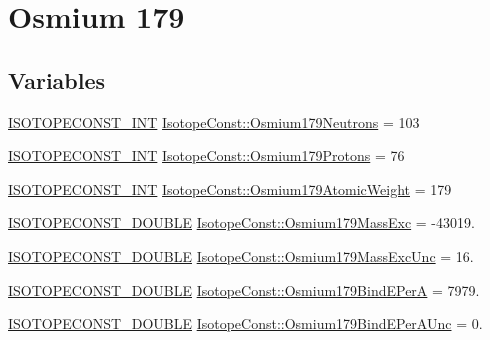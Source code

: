 \hypertarget{group___isotope_const-_osmium-_os179}{}\section{Osmium 179}
\label{group___isotope_const-_osmium-_os179}
\subsection*{Variables}
\begin{DoxyCompactItemize}
\item 
\mbox{\hyperlink{group___isotope_const-_macros_ga5f18360b3e99483a35c32d789e62621c}{I\+S\+O\+T\+O\+P\+E\+C\+O\+N\+S\+T\+\_\+\+I\+NT}} \mbox{\hyperlink{group___isotope_const-_osmium-_os179_ga57acb16b6f2ca1c5cada07e9a36fd16e}{Isotope\+Const\+::\+Osmium179\+Neutrons}} = 103
\item 
\mbox{\hyperlink{group___isotope_const-_macros_ga5f18360b3e99483a35c32d789e62621c}{I\+S\+O\+T\+O\+P\+E\+C\+O\+N\+S\+T\+\_\+\+I\+NT}} \mbox{\hyperlink{group___isotope_const-_osmium-_os179_gaaef6a4e4759e2fff9088199f24a255cc}{Isotope\+Const\+::\+Osmium179\+Protons}} = 76
\item 
\mbox{\hyperlink{group___isotope_const-_macros_ga5f18360b3e99483a35c32d789e62621c}{I\+S\+O\+T\+O\+P\+E\+C\+O\+N\+S\+T\+\_\+\+I\+NT}} \mbox{\hyperlink{group___isotope_const-_osmium-_os179_ga576c07028d0a757222f948e258fd2a59}{Isotope\+Const\+::\+Osmium179\+Atomic\+Weight}} = 179
\item 
\mbox{\hyperlink{group___isotope_const-_macros_ga8f45a7272ce02c0b4c65c44636ed719a}{I\+S\+O\+T\+O\+P\+E\+C\+O\+N\+S\+T\+\_\+\+D\+O\+U\+B\+LE}} \mbox{\hyperlink{group___isotope_const-_osmium-_os179_ga9f48bb9696dca3395c91a58b3e1acb40}{Isotope\+Const\+::\+Osmium179\+Mass\+Exc}} = -\/43019.
\item 
\mbox{\hyperlink{group___isotope_const-_macros_ga8f45a7272ce02c0b4c65c44636ed719a}{I\+S\+O\+T\+O\+P\+E\+C\+O\+N\+S\+T\+\_\+\+D\+O\+U\+B\+LE}} \mbox{\hyperlink{group___isotope_const-_osmium-_os179_gafe9424e97c85b52fbdee2689dfe19f9e}{Isotope\+Const\+::\+Osmium179\+Mass\+Exc\+Unc}} = 16.
\item 
\mbox{\hyperlink{group___isotope_const-_macros_ga8f45a7272ce02c0b4c65c44636ed719a}{I\+S\+O\+T\+O\+P\+E\+C\+O\+N\+S\+T\+\_\+\+D\+O\+U\+B\+LE}} \mbox{\hyperlink{group___isotope_const-_osmium-_os179_gabe78cb734c8145deb53a080482f8cdcb}{Isotope\+Const\+::\+Osmium179\+Bind\+E\+PerA}} = 7979.
\item 
\mbox{\hyperlink{group___isotope_const-_macros_ga8f45a7272ce02c0b4c65c44636ed719a}{I\+S\+O\+T\+O\+P\+E\+C\+O\+N\+S\+T\+\_\+\+D\+O\+U\+B\+LE}} \mbox{\hyperlink{group___isotope_const-_osmium-_os179_ga7823bfcbfc742c021ddafd324548614d}{Isotope\+Const\+::\+Osmium179\+Bind\+E\+Per\+A\+Unc}} = 0.

\end{DoxyCompactItemize}
